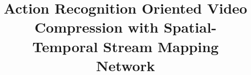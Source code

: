 \documentclass[a4paper]{cas-sc}
\begin{document}
\let\WriteBookmarks\relax
\def\floatpagepagefraction{1}
\def\textpagefraction{.001}



\title [mode = title]{Action Recognition Oriented Video Compression with Spatial-Temporal Stream Mapping Network}  



%













\end{document}
